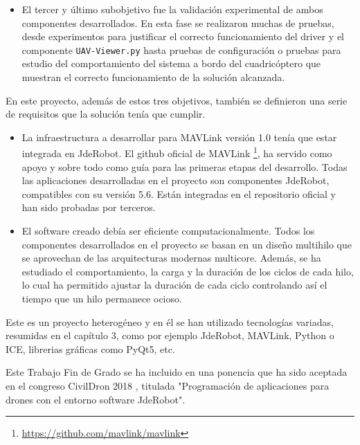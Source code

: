 \begin{itemize}
\item El tercer y último subobjetivo fue la validación experimental de ambos componentes desarrollados. En esta fase se realizaron muchas de pruebas, desde experimentos para justificar el correcto funcionamiento del driver y el componente \texttt{UAV-Viewer.py} hasta pruebas de configuración o pruebas para estudio del comportamiento del sistema a bordo del cuadricóptero que muestran el correcto funcionamiento de la solución alcanzada.

\end{itemize}

En este proyecto, además de estos tres objetivos, también se definieron una serie de requisitos que la solución tenía que cumplir.

\begin{itemize}
\item La infraestructura a desarrollar para MAVLink versión 1.0 tenía que estar integrada en JdeRobot. El github oficial de MAVLink \footnote{\url{https://github.com/mavlink/mavlink}}, ha servido como apoyo y sobre todo como guía para las primeras etapas del desarrollo. Todas las aplicaciones desarrolladas en el proyecto son componentes JdeRobot, compatibles con su versión 5.6. Están integradas en el repositorio oficial y han sido probadas por terceros.
\item El software creado debía ser eficiente computacionalmente. Todos los componentes desarrollados en el proyecto se basan en un diseño multihilo que se aprovechan de las arquitecturas modernas multicore. Además, se ha estudiado el comportamiento, la carga y la duración de los ciclos de cada hilo, lo cual ha permitido ajustar la duración de cada ciclo controlando así el tiempo que un hilo permanece ocioso.

\end{itemize}

Este es un proyecto heterogéneo y en él se han utilizado tecnologías variadas, resumidas en el capítulo 3, como por ejemplo JdeRobot, MAVLink, Python o ICE, librerias gráficas como PyQt5, etc.

Este Trabajo Fin de Grado se ha incluido en una ponencia que ha sido aceptada en el congreso CivilDron 2018 \cite{civilDron}, titulada "Programación de aplicaciones para drones con el entorno software JdeRobot". 

